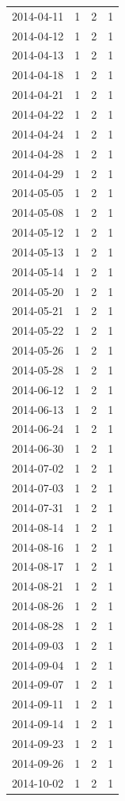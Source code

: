 \begin{tabular}{lrrr}
2014-04-11 & 1 & 2 & 1 \\
2014-04-12 & 1 & 2 & 1 \\
2014-04-13 & 1 & 2 & 1 \\
2014-04-18 & 1 & 2 & 1 \\
2014-04-21 & 1 & 2 & 1 \\
2014-04-22 & 1 & 2 & 1 \\
2014-04-24 & 1 & 2 & 1 \\
2014-04-28 & 1 & 2 & 1 \\
2014-04-29 & 1 & 2 & 1 \\
2014-05-05 & 1 & 2 & 1 \\
2014-05-08 & 1 & 2 & 1 \\
2014-05-12 & 1 & 2 & 1 \\
2014-05-13 & 1 & 2 & 1 \\
2014-05-14 & 1 & 2 & 1 \\
2014-05-20 & 1 & 2 & 1 \\
2014-05-21 & 1 & 2 & 1 \\
2014-05-22 & 1 & 2 & 1 \\
2014-05-26 & 1 & 2 & 1 \\
2014-05-28 & 1 & 2 & 1 \\
2014-06-12 & 1 & 2 & 1 \\
2014-06-13 & 1 & 2 & 1 \\
2014-06-24 & 1 & 2 & 1 \\
2014-06-30 & 1 & 2 & 1 \\
2014-07-02 & 1 & 2 & 1 \\
2014-07-03 & 1 & 2 & 1 \\
2014-07-31 & 1 & 2 & 1 \\
2014-08-14 & 1 & 2 & 1 \\
2014-08-16 & 1 & 2 & 1 \\
2014-08-17 & 1 & 2 & 1 \\
2014-08-21 & 1 & 2 & 1 \\
2014-08-26 & 1 & 2 & 1 \\
2014-08-28 & 1 & 2 & 1 \\
2014-09-03 & 1 & 2 & 1 \\
2014-09-04 & 1 & 2 & 1 \\
2014-09-07 & 1 & 2 & 1 \\
2014-09-11 & 1 & 2 & 1 \\
2014-09-14 & 1 & 2 & 1 \\
2014-09-23 & 1 & 2 & 1 \\
2014-09-26 & 1 & 2 & 1 \\
2014-10-02 & 1 & 2 & 1 \\

\end{tabular}
